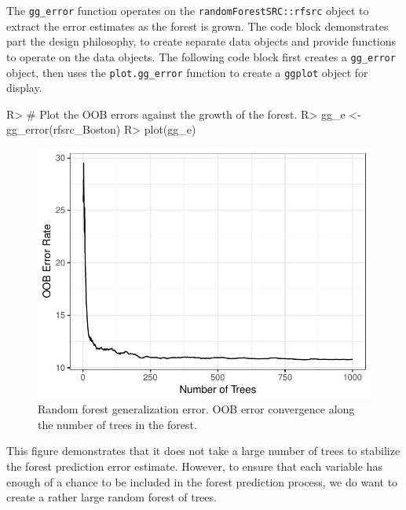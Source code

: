 \documentclass[article]{jss}
\begin{document}
The \texttt{gg\_error} function operates on the
\texttt{randomForestSRC::rfsrc} object to extract the error estimates as
the forest is grown. The code block demonstrates part the
 design philosophy, to create separate data objects
and provide functions to operate on the data objects. The following code
block first creates a \texttt{gg\_error} object, then uses the
\texttt{plot.gg\_error} function to create a \texttt{ggplot} object for
display.

\begin{CodeChunk}

\begin{CodeInput}
R> # Plot the OOB errors against the growth of the forest.
R> gg_e <- gg_error(rfsrc_Boston)
R> plot(gg_e)
\end{CodeInput}
\begin{figure}

{\centering \includegraphics{Regression-rfsrc_files/figure-latex/error-1} 

}

\caption[Random forest generalization error]{Random forest generalization error. OOB error convergence along the number of trees in the forest.}\label{fig:error}
\end{figure}
\end{CodeChunk}

This figure demonstrates that it does not take a large number of trees
to stabilize the forest prediction error estimate. However, to ensure
that each variable has enough of a chance to be included in the forest
prediction process, we do want to create a rather large random forest of
trees.
\end{document}
